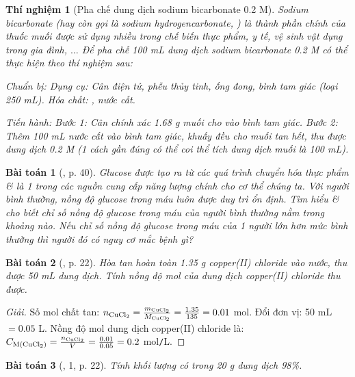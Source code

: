 \documentclass{article}
\newtheorem{baitoan}{Bài toán}
\newtheorem{thinghiem}{Thí nghiệm}
\begin{document}
\begin{thinghiem}[Pha chế dung dịch sodium bicarbonate 0.2 M]
	Sodium bicarbonate (hay còn gọi là sodium hydrogencarbonate, ) là thành phần chính của thuốc muối được sử dụng nhiều trong chế biến thực phẩm, y tế, vệ sinh vật dụng trong gia đình, $\ldots$ Để pha chế 100 mL dung dịch sodium bicarbonate 0.2 M có thể thực hiện theo thí nghiệm sau:
	
	\emph{Chuẩn bị:} Dụng cụ: Cân điện tử, phễu thủy tinh, ống đong, bình tam giác (loại \emph{250 mL}). Hóa chất: \emph{}, nước cất.
	
	\emph{Tiến hành:} Bước 1: Cân chính xác \emph{1.68 g} muối \emph{} cho vào bình tam giác. Bước 2: Thêm \emph{100 mL} nước cất vào bình tam giác, khuấy đều cho muối tan hết, thu được dung dịch \emph{ 0.2 M} (1 cách gần đúng có thể coi thể tích dung dịch muối  là \emph{100 mL}).
\end{thinghiem}

\begin{baitoan}[\cite{SGK_KHTN_8_Canh_Dieu}, p. 40]
	Glucose được tạo ra từ các quá trình chuyển hóa thực phẩm \& là 1 trong các nguồn cung cấp năng lượng chính cho cơ thể chúng ta. Với người bình thường, nồng độ glucose trong máu luôn được duy trì ổn định. Tìm hiểu \& cho biết chỉ số nồng độ glucose trong máu của người bình thường nằm trong khoảng nào. Nếu chỉ số nồng độ glucose trong máu của 1 người lớn hơn mức bình thường thì người đó có nguy cơ mắc bệnh gì?
\end{baitoan}

\begin{baitoan}[\cite{SGK_KHTN_8_KNTTVCS}, p. 22]
	Hòa tan hoàn toàn \emph{1.35 g} copper(II) chloride vào nước, thu được \emph{50 mL} dung dịch. Tính nồng độ mol của dung dịch copper(II) chloride thu được.
\end{baitoan}

\begin{proof}[Giải]
	Số mol chất tan: $n_{\ce{CuCl2}} = \frac{m_{\ce{CuCl2}}}{M_{\ce{CuCl2}}} = \frac{1.35}{135} = 0.01$ mol. Đổi đơn vị: 50 mL $= 0.05$ L. Nồng độ mol dung dịch copper(II) chloride là: $C_{\rm M(\ce{CuCl2})} = \frac{n_{\ce{CuCl2}}}{V} = \frac{0.01}{0.05} = 0.2$ mol\texttt{/}L.
\end{proof}

\begin{baitoan}[\cite{SGK_KHTN_8_KNTTVCS}, 1, p. 22]
	Tính khối lượng \emph{} có trong \emph{20 g} dung dịch \emph{ 98\%}.
\end{baitoan}
\end{document}
